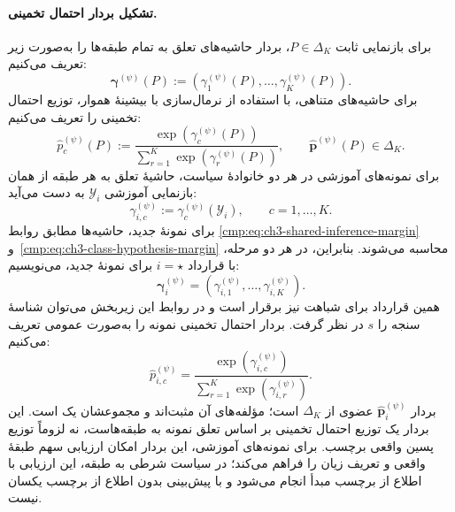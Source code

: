 \paragraph{تشکیل بردار احتمال تخمینی.}
برای بازنمایی ثابت $P\in\Delta_K$، بردار حاشیه‌های
تعلق به تمام طبقه‌ها را به‌صورت زیر تعریف می‌کنیم:
\begin{equation}\label{cmp:eq:ch3-fixed-margin-vector}
\boldsymbol\gamma^{(\psi)}(P)
:=(\gamma_1^{(\psi)}(P),\ldots,\gamma_K^{(\psi)}(P)).
\end{equation}
برای حاشیه‌های متناهی، با استفاده از نرمال‌سازی با
بیشینهٔ هموار، توزیع احتمال تخمینی را تعریف می‌کنیم:
\begin{equation}\label{cmp:eq:ch3-fixed-margin-softmax}
\widehat p_c^{(\psi)}(P)
:=\frac{\exp(\gamma_c^{(\psi)}(P))}
{\sum_{r=1}^{K}\exp(\gamma_r^{(\psi)}(P))},
\qquad \widehat{\boldsymbol p}^{(\psi)}(P)\in\Delta_K.
\end{equation}
برای نمونه‌های آموزشی در هر دو خانوادهٔ سیاست،
حاشیهٔ تعلق به هر طبقه از همان بازنمایی آموزشی
$\mathscr Y_i$ به دست می‌آید:
\begin{equation}\label{cmp:eq:ch3-training-all-class-margins}
\gamma_{i,c}^{(\psi)}:=\gamma_c^{(\psi)}(\mathscr Y_i),
\qquad c=1,\ldots,K.
\end{equation}
برای نمونهٔ جدید، حاشیه‌ها مطابق روابط
\eqref{cmp:eq:ch3-shared-inference-margin}
و~\eqref{cmp:eq:ch3-class-hypothesis-margin} محاسبه
می‌شوند. بنابراین، در هر دو مرحله، با قرارداد
$i=\star$ برای نمونهٔ جدید، می‌نویسیم:
\begin{equation}\label{cmp:eq:ch3-all-class-margin-vector}
\boldsymbol\gamma_i^{(\psi)}
=(\gamma_{i,1}^{(\psi)},\ldots,\gamma_{i,K}^{(\psi)}).
\end{equation}
همین قرارداد برای شباهت نیز برقرار است و در روابط
این زیربخش می‌توان شناسهٔ سنجه را $s$ در نظر گرفت.
بردار احتمال تخمینی نمونه را به‌صورت عمومی تعریف می‌کنیم:
\begin{equation}\label{cmp:eq:ch3-margin-softmax-unit}
\boxed{\widehat p_{i,c}^{(\psi)}
=\frac{\exp(\gamma_{i,c}^{(\psi)})}
{\sum_{r=1}^{K}\exp(\gamma_{i,r}^{(\psi)})}.}
\end{equation}
بردار $\widehat{\boldsymbol p}_i^{(\psi)}$ عضوی از
$\Delta_K$ است؛ مؤلفه‌های آن مثبت‌اند و مجموعشان یک است.
این بردار یک توزیع احتمال تخمینی بر اساس تعلق نمونه
به طبقه‌هاست، نه لزوماً توزیع پسین واقعی برچسب.
برای نمونه‌های آموزشی، این بردار امکان ارزیابی سهم
طبقهٔ واقعی و تعریف زیان را فراهم می‌کند؛ در سیاست
شرطی به طبقه، این ارزیابی با اطلاع از برچسب مبدأ انجام
می‌شود و با پیش‌بینی بدون اطلاع از برچسب یکسان نیست.

